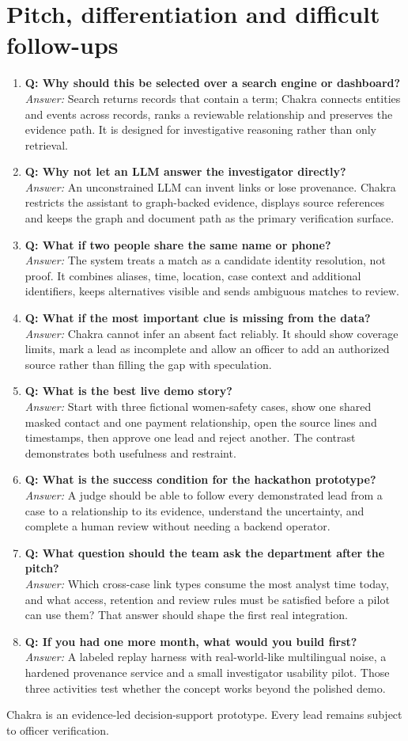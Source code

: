 \documentclass[10pt,a4paper]{article}
\newcommand{\qa}[2]{\item \textbf{\color{navy}Q: #1}\\[-1pt]{\color{coral}\textit{Answer:}} #2}
\begin{document}
\section{Pitch, differentiation and difficult follow-ups}
\begin{enumerate}[resume]
\qa{Why should this be selected over a search engine or dashboard?}{Search returns records that contain a term; Chakra connects entities and events across records, ranks a reviewable relationship and preserves the evidence path. It is designed for investigative reasoning rather than only retrieval.}
\qa{Why not let an LLM answer the investigator directly?}{An unconstrained LLM can invent links or lose provenance. Chakra restricts the assistant to graph-backed evidence, displays source references and keeps the graph and document path as the primary verification surface.}
\qa{What if two people share the same name or phone?}{The system treats a match as a candidate identity resolution, not proof. It combines aliases, time, location, case context and additional identifiers, keeps alternatives visible and sends ambiguous matches to review.}
\qa{What if the most important clue is missing from the data?}{Chakra cannot infer an absent fact reliably. It should show coverage limits, mark a lead as incomplete and allow an officer to add an authorized source rather than filling the gap with speculation.}
\qa{What is the best live demo story?}{Start with three fictional women-safety cases, show one shared masked contact and one payment relationship, open the source lines and timestamps, then approve one lead and reject another. The contrast demonstrates both usefulness and restraint.}
\qa{What is the success condition for the hackathon prototype?}{A judge should be able to follow every demonstrated lead from a case to a relationship to its evidence, understand the uncertainty, and complete a human review without needing a backend operator.}
\qa{What question should the team ask the department after the pitch?}{Which cross-case link types consume the most analyst time today, and what access, retention and review rules must be satisfied before a pilot can use them? That answer should shape the first real integration.}
\qa{If you had one more month, what would you build first?}{A labeled replay harness with real-world-like multilingual noise, a hardened provenance service and a small investigator usability pilot. Those three activities test whether the concept works beyond the polished demo.}
\end{enumerate}
\vfill
\begin{center}\small\color{teal}Chakra is an evidence-led decision-support prototype. Every lead remains subject to officer verification.\end{center}
\end{document}
